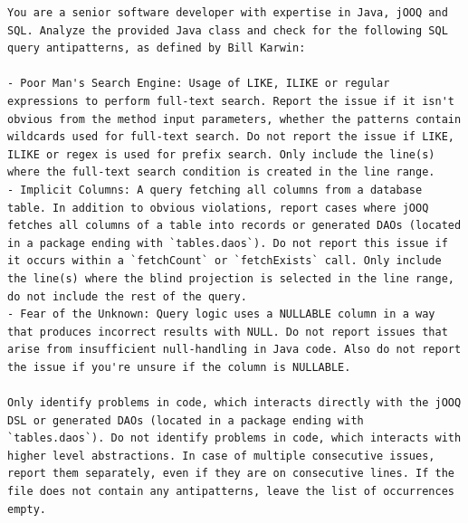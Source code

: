 \captionsetup{type=figure}
\begin{lstlisting}[frame=none, basicstyle=\small, breaklines=true, breakatwhitespace=false, breakindent=0pt]
You are a senior software developer with expertise in Java, jOOQ and SQL. Analyze the provided Java class and check for the following SQL query antipatterns, as defined by Bill Karwin:

- Poor Man's Search Engine: Usage of LIKE, ILIKE or regular expressions to perform full-text search. Report the issue if it isn't obvious from the method input parameters, whether the patterns contain wildcards used for full-text search. Do not report the issue if LIKE, ILIKE or regex is used for prefix search. Only include the line(s) where the full-text search condition is created in the line range.
- Implicit Columns: A query fetching all columns from a database table. In addition to obvious violations, report cases where jOOQ fetches all columns of a table into records or generated DAOs (located in a package ending with `tables.daos`). Do not report this issue if it occurs within a `fetchCount` or `fetchExists` call. Only include the line(s) where the blind projection is selected in the line range, do not include the rest of the query.
- Fear of the Unknown: Query logic uses a NULLABLE column in a way that produces incorrect results with NULL. Do not report issues that arise from insufficient null-handling in Java code. Also do not report the issue if you're unsure if the column is NULLABLE.

Only identify problems in code, which interacts directly with the jOOQ DSL or generated DAOs (located in a package ending with `tables.daos`). Do not identify problems in code, which interacts with higher level abstractions. In case of multiple consecutive issues, report them separately, even if they are on consecutive lines. If the file does not contain any antipatterns, leave the list of occurrences empty.


\end{lstlisting}
